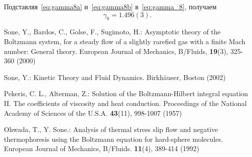 \documentclass[a4paper,12pt]{article}
\begin{document}
Подставляя~\eqref{eq:gamma8a} и~\eqref{eq:gamma8b} в~\eqref{eq:gamma_8}, получаем
\begin{equation}\label{eq:gamma_8_result}
    \gamma_8 = 1.496(3).
\end{equation}


\begin{thebibliography}{9}

    Sone, Y., Bardos, C., Golse, F., Sugimoto, H.:
    Asymptotic theory of the Boltzmann system, for a steady flow of a slightly rarefied gas
    with a finite Mach number: General theory.
    \newblock European Journal of Mechanics, B/Fluids, \textbf{19}(3), 325-360 (2000)

    Sone, Y.: Kinetic Theory and Fluid Dynamics.
    \newblock Birkh{\"a}user, Boston (2002)

    Pekeris, C. L., Alterman, Z.: Solution of the Boltzmann-Hilbert integral equation II.
    The coefficients of viscosity and heat conduction.
    \newblock Proceedings of the National Academy of Sciences of the U.S.A. \textbf{43}(11), 998-1007 (1957)

    Ohwada, T., Y. Sone.: Analysis of thermal stress slip flow and negative thermophoresis
    using the Boltzmann equation for hard-sphere molecules.
    \newblock European Journal of Mechanics, B/Fluids. \textbf{11}(4), 389-414 (1992)

\end{thebibliography}
\end{document}

